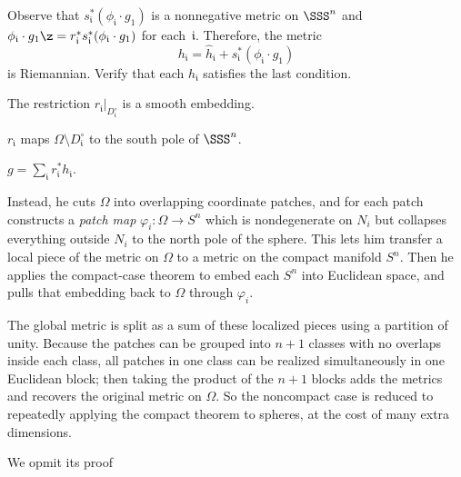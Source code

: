 Observe that $s_{\mathfrak{i}}^*(\phi_{\mathfrak{i}} \cdot g_1)$ is a nonnegative metric on $\SSS^n$ and $\phi_{\mathfrak{i}} \cdot g_1\z=r_{\mathfrak{i}}^*s_{\mathfrak{i}}^*(\phi_{\mathfrak{i}} \cdot g_1)$ for each~$\mathfrak{i}$.
Therefore, the metric
\[
h_{\mathfrak{i}} = \hat h_{\mathfrak{i}} + s_{\mathfrak{i}}^*(\phi_{\mathfrak{i}} \cdot g_1)
\]
is Riemannian.
Verify that each $h_{\mathfrak{i}}$ satisfies the last condition.












\begin{subthm}{}
The restriction $r_{\mathfrak{i}}|_{D_{\mathfrak{i}}^\circ}$ is a smooth embedding.
\end{subthm}

\begin{subthm}{}
$r_{\mathfrak{i}}$ maps $\Omega\setminus D_{\mathfrak{i}}^\circ$ to the south pole of $\SSS^n$.
\end{subthm}

\begin{subthm}{}
$g=\sum_{\mathfrak{i}} r_{\mathfrak{i}}^*h_{\mathfrak{i}}$.
\end{subthm}

Instead, he cuts \(\Omega\) into overlapping coordinate patches, and for each patch
constructs a \emph{patch map} \(\varphi_i : \Omega \to S^n\) which is nondegenerate on \(N_i\)
but collapses everything outside \(N_i\) to the north pole of the sphere.
This lets him transfer a local piece of the metric on \(\Omega\) to a metric on the compact
manifold \(S^n\). Then he applies the compact-case theorem to embed each \(S^n\) into
Euclidean space, and pulls that embedding back to \(\Omega\) through \(\varphi_i\).

The global metric is split as a sum of these localized pieces using a partition of unity.
Because the patches can be grouped into \(n+1\) classes with no overlaps inside each class,
all patches in one class can be realized simultaneously in one Euclidean block; then taking
the product of the \(n+1\) blocks adds the metrics and recovers the original metric on \(\Omega\).
So the noncompact case is reduced to repeatedly applying the compact theorem to spheres,
at the cost of many extra dimensions.

We opmit its proof





